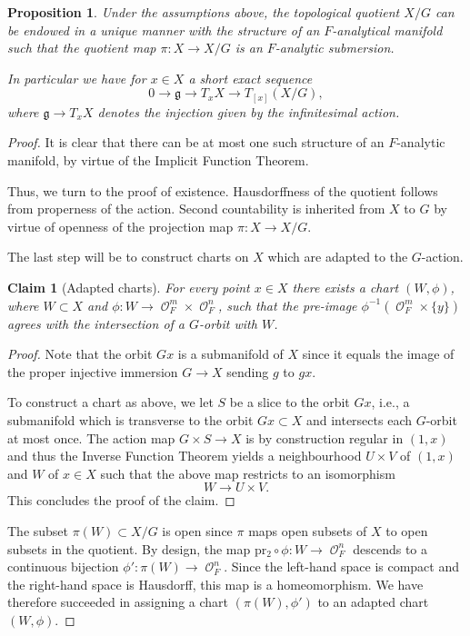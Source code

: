 \documentclass{article}
\DeclareMathOperator{\Oc}{\mathcal{O}}
\theoremstyle{definition}
\theoremstyle{plain}
\newtheorem{proposition}[definition]{Proposition}
\newtheorem{claim}[definition]{Claim}
\begin{document}
\begin{proposition}\label{prop:quotient}\cite[Theorem II.III.12.1]{Se09}
 Under the assumptions above, the topological quotient $X/G$ can be endowed in a unique manner with the structure of an $F$-analytical manifold such that the quotient map $\pi\colon X \to X/G$ is an $F$-analytic submersion.  

In particular we have for $x \in X$ a short exact sequence
\[ 0 \to \mathfrak{g} \to T_xX \to T_{[x]}(X/G), \]
where $\mathfrak{g} \to T_xX$ denotes the injection given by the infinitesimal action. 
 
\end{proposition}
\begin{proof}
 It is clear that there can be at most one such structure of an $F$-analytic manifold, by virtue of the Implicit Function Theorem. 

 Thus, we turn to the proof of existence. Hausdorffness of the quotient follows from properness of the action. Second countability is inherited from $X$ to $G$ by virtue of openness of the projection map $\pi\colon X \to X/G$.
 
The last step will be to construct charts on $X$ which are adapted to the $G$-action.
 
 \begin{claim}[Adapted charts]\label{cl:adapted}
 For every point $x \in X$ there exists a chart $(W,\phi)$, where $W \subset X$ and $\phi\colon W \to \Oc_F^m \times \Oc_F^n$, such that the pre-image $\phi^{-1}(\Oc_F^m \times \{y\})$ agrees with the intersection of a $G$-orbit with $W$. 
\end{claim}

\begin{proof}
 Note that the orbit $Gx$ is a submanifold of $X$ since it equals the image of the proper injective immersion $G \to X$ sending $g$ to $gx$. 
 
 To construct a chart as above, we let $S$ be a slice to the orbit $Gx$, i.e., a submanifold which is transverse to the orbit $Gx \subset X$ and intersects each $G$-orbit at most once. The action map $G \times S \to X$ is by construction regular in $(1,x)$ and thus the Inverse Function Theorem yields a neighbourhood $U \times V$ of $(1,x)$ and $W$ of $x \in X$ such that the above map restricts to an isomorphism
 $$W \to U \times V.$$
 This concludes the proof of the claim.
 \end{proof}

The subset $\pi(W)\subset X/G$ is open since $\pi$ maps open subsets of $X$ to open subsets in the quotient. By design, the map $\mathrm{pr_2}\circ\phi\colon W \to \Oc_F^n$ descends to a continuous bijection $\phi'\colon \pi(W) \to \Oc_F^{n}$. Since the left-hand space is compact and the right-hand space is Hausdorff, this map is a homeomorphism. We have therefore succeeded in assigning a chart $(\pi(W),\phi')$ to an adapted chart $(W,\phi)$.


\end{proof}
\end{document}
